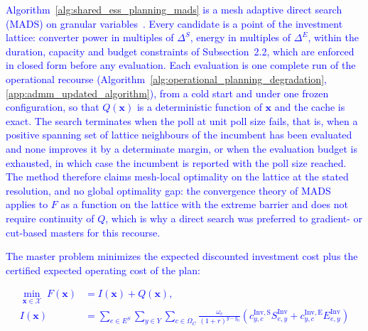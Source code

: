 \textcolor{blue}{Algorithm~\ref{alg:shared_ess_planning_mads} is a mesh adaptive direct search (MADS) on
granular variables~\cite{audet_dennis_2006,abramson_orthomads_2009,audet_granular_2019}. Every candidate is a
point of the investment lattice: converter power in multiples of $\Delta^S$, energy in multiples of
$\Delta^E$, within the duration, capacity and budget constraints of Subsection~2.2, which are enforced in closed
form before any evaluation. Each evaluation is one complete run of the operational recourse
(Algorithm~\ref{alg:operational_planning_degradation}, \ref{app:admm_updated_algorithm}), from a cold start and
under one frozen configuration, so that $Q(\boldsymbol{x})$ is a deterministic function of $\boldsymbol{x}$ and the
cache is exact. The search terminates when the poll at unit poll size fails, that is, when a positive spanning
set of lattice neighbours of the incumbent has been evaluated and none improves it by a determinate margin, or
when the evaluation budget is exhausted, in which case the incumbent is reported with the poll size reached.
The method therefore claims mesh-local optimality on the lattice at the stated resolution, and no global
optimality gap: the convergence theory of MADS applies to $F$ as a function on the lattice with the extreme
barrier and does not require continuity of $Q$, which is why a direct search was preferred to gradient- or
cut-based masters for this recourse.}



\textcolor{blue}{The master problem minimizes the expected discounted investment cost plus the certified
expected operating cost of the plan:}

\textcolor{blue}{
    \begin{equation}
        \begin{aligned}
            \min_{\boldsymbol{x} \in \mathcal{X}} \; F(\boldsymbol{x}) &= I(\boldsymbol{x}) + Q(\boldsymbol{x}), \\
            I(\boldsymbol{x}) &=
            \sum_{e\in E^S} \sum_{y\in Y} \sum_{c\in\Omega_C}
            \frac{\omega_c}{(1+r)^{y-y_0}}
            \left(
                c^{\mathrm{Inv,S}}_{y,c} S^{\mathrm{Inv}}_{e,y}
                +
                c^{\mathrm{Inv,E}}_{y,c} E^{\mathrm{Inv}}_{e,y}
            \right)
        \end{aligned}
        \label{eq:master_objective}
    \end{equation}
}

